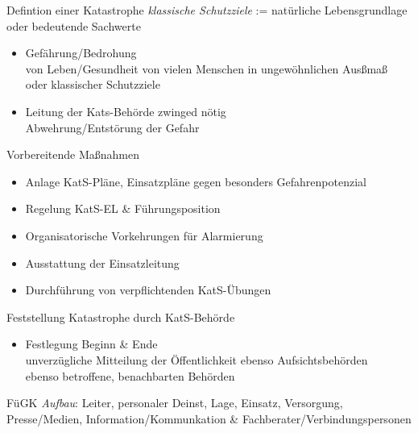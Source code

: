 \begin{warningbox}{Defintion einer Katastrophe}
    \emph{klassische Schutzziele} := natürliche Lebensgrundlage oder bedeutende Sachwerte
    \begin{itemize} 
        \item Gefährung/Bedrohung\\
        \ra von Leben/Gesundheit von vielen Menschen in ungewöhnlichen Ausßmaß\\
        \ra oder klassischer Schutzziele
        \item Leitung der Kats-Behörde zwinged nötig\\
        \ra Abwehrung/Entstörung der Gefahr  
    \end{itemize}
    \begin{hintbox}{Vorbereitende Maßnahmen}
        \begin{itemize}
            \item Anlage KatS-Pläne, Einsatzpläne gegen besonders Gefahrenpotenzial
            \item Regelung KatS-EL \& Führungsposition
            \item Organisatorische Vorkehrungen für Alarmierung
            \item Ausstattung der Einsatzleitung
            \item Durchführung von verpflichtenden KatS-Übungen
        \end{itemize}
    \end{hintbox}
    \begin{hintbox}{Feststellung Katastrophe durch KatS-Behörde}
        \begin{itemize}
            \item Festlegung Beginn \& Ende\\
            \ra unverzügliche Mitteilung der Öffentlichkeit
            \ra ebenso Aufsichtsbehörden\\
            \ra ebenso betroffene, benachbarten Behörden
        \end{itemize}
    \end{hintbox}
\end{warningbox}
\begin{sectionbox}{FüGK}
    \emph{Aufbau}: Leiter, personaler Deinst, Lage, Einsatz, Versorgung, Presse/Medien, Information/Kommunkation \& Fachberater/Verbindungspersonen
\end{sectionbox}
